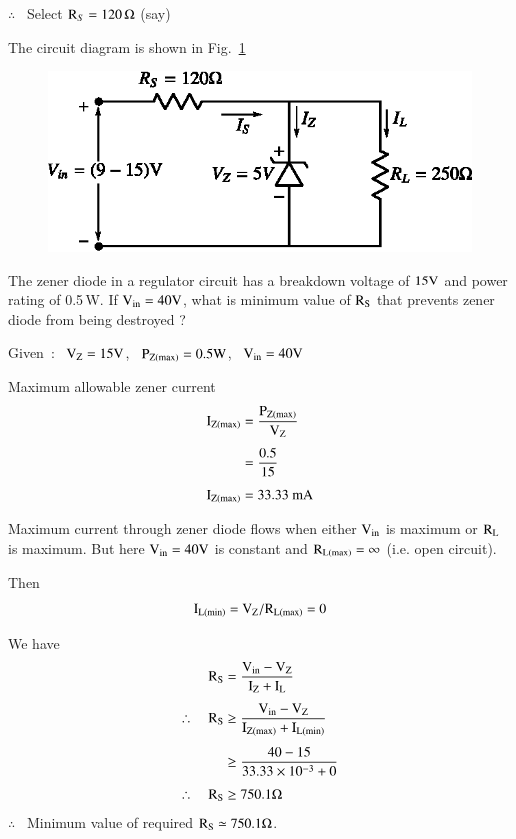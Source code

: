 \begin{solution}
\noindent
$\therefore$~ Select $\textrm{R}_{S}=120\,\Omega$ (say)

The circuit diagram is shown in Fig.~\ref{fig1.49}
\begin{figure}[H]
\centering
\includegraphics{chap1/fig1.49.eps}
\caption{}\label{fig1.49}
\end{figure}
\end{solution}

\begin{problem}\label{prob1.31}
The zener diode in a regulator circuit has a breakdown voltage of $15\textrm{V}$ and power rating of 0.5\,W. If $\textrm{V}_{\text{in}}=40\textrm{V}$, what is minimum value of $\textrm{R}_{\textrm{S}}$ that prevents zener diode from being destroyed ?
\end{problem}

\begin{solution}
Given~:~ $\textrm{V}_{\textrm{Z}}=15\textrm{V}$, \ $\textrm{P}_{\textrm{Z}(\max)}=0.5\textrm{W}$, \ $\textrm{V}_{\text{in}}=40\textrm{V}$

Maximum allowable zener current
\begin{align*}
\textrm{I}_{\textrm{Z}(\max)} &= \frac{\textrm{P}_{\textrm{Z}(\max)}}{\textrm{V}_{\textrm{Z}}}\\[4pt]
&= \frac{0.5}{15}\\[4pt]
\textrm{I}_{\textrm{Z}(\max)} &= 33.33\text{~mA}
\end{align*}

Maximum current through zener diode flows when either $\textrm{V}_{\text{in}}$ is maximum or $\textrm{R}_{\textrm{L}}$ is maximum. But here $\textrm{V}_{\text{in}}=40\textrm{V}$ is constant and $\textrm{R}_{\textrm{L}(\max)}=\infty$ (i.e. open circuit).

Then 
$$
\textrm{I}_{\textrm{L}(\min)}=\textrm{V}_{\textrm{Z}}/\textrm{R}_{\textrm{L}(\max)}=0
$$

We have
\begin{align*}
\textrm{R}_{\textrm{S}} &= \dfrac{\textrm{V}_{\text{in}}-\textrm{V}_{\textrm{Z}}}{\textrm{I}_{\textrm{Z}}+\textrm{I}_{\textrm{L}}}\\[4pt]
\therefore\quad \textrm{R}_{\textrm{S}} &\geq \dfrac{\textrm{V}_{\text{in}}-\textrm{V}_{\textrm{Z}}}{\textrm{I}_{\textrm{Z}(\max)}+\textrm{I}_{\textrm{L}(\min)}}\\[4pt]
&\geq \dfrac{40-15}{33.33\times 10^{-3}+0}\\[4pt]
\therefore\quad \textrm{R}_{\textrm{S}} &\geq 750.1\Omega
\end{align*}
$\therefore$~ Minimum value of required $\textrm{R}_{\textrm{S}}\simeq 750.1\Omega$.
\end{solution}

